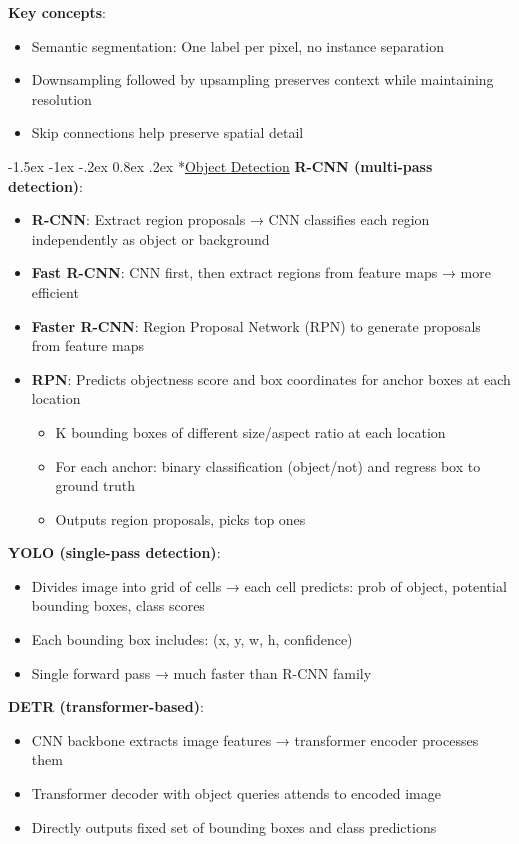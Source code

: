 \documentclass{article}
\makeatletter
\renewcommand\section{\@startsection{section}{1}{\z@}%
                                  {-1.5ex \@plus -1ex \@minus -.2ex}%
                                  {0.8ex \@plus.2ex}%
                                  {\normalfont\small\bfseries}}
\makeatother
\begin{document}
\begin{multicols}{3}
\textbf{Key concepts}:
\begin{itemize}
\item Semantic segmentation: One label per pixel, no instance separation
\item Downsampling followed by upsampling preserves context while maintaining resolution
\item Skip connections help preserve spatial detail
\end{itemize}

\section*{\underline{Object Detection}}
\textbf{R-CNN (multi-pass detection)}:
\begin{itemize}
\item \textbf{R-CNN}: Extract region proposals → CNN classifies each region independently as object or background
\item \textbf{Fast R-CNN}: CNN first, then extract regions from feature maps → more efficient
\item \textbf{Faster R-CNN}: Region Proposal Network (RPN) to generate proposals from feature maps
\item \textbf{RPN}: Predicts objectness score and box coordinates for anchor boxes at each location
  \begin{itemize}
    \item K bounding boxes of different size/aspect ratio at each location
    \item For each anchor: binary classification (object/not) and regress box to ground truth
    \item Outputs region proposals, picks top ones
  \end{itemize}
\end{itemize}

\textbf{YOLO (single-pass detection)}:
\begin{itemize}
\item Divides image into grid of cells → each cell predicts: prob of object, potential bounding boxes, class scores
\item Each bounding box includes: (x, y, w, h, confidence)
\item Single forward pass → much faster than R-CNN family
\end{itemize}

\textbf{DETR (transformer-based)}:
\begin{itemize}
\item CNN backbone extracts image features → transformer encoder processes them
\item Transformer decoder with object queries attends to encoded image
\item Directly outputs fixed set of bounding boxes and class predictions
\end{itemize}


\end{multicols}
\end{document}
